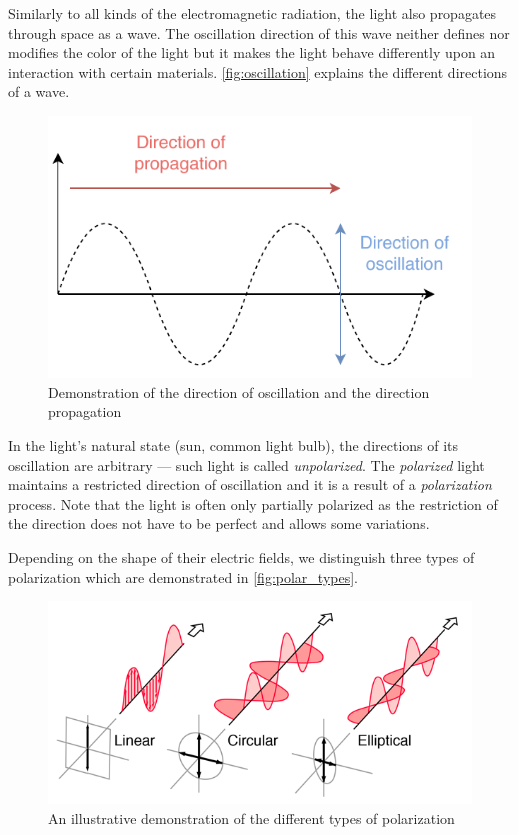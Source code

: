 Similarly to all kinds of the electromagnetic radiation, the light also propagates through space as a wave. The oscillation direction of this wave neither defines nor modifies the color of the light but it makes the light behave differently upon an interaction with certain materials. \autoref{fig:oscillation} explains the different directions of a wave.

\begin{figure}[h]
	\centering
	\includegraphics[width=.6\linewidth]{img/oscillation.pdf}
	\caption{Demonstration of the direction of oscillation and the direction propagation}
	\label{fig:oscillation}
\end{figure}

In the light's natural state (sun, common light bulb), the directions of its oscillation are arbitrary --- such light is called \emph{unpolarized}. The \emph{polarized} light maintains a restricted direction of oscillation and it is a result of a \emph{polarization} process. Note that the light is often only partially polarized as the restriction of the direction does not have to be perfect and allows some variations.

Depending on the shape of their electric fields, we distinguish three types of polarization which are demonstrated in \autoref{fig:polar_types}.

\begin{figure}[h]
	\centering
	\includegraphics[width=.7\linewidth]{img/polar_types.png}
	\caption[polar types]{An illustrative demonstration of the different types of polarization \footnotemark}
	\label{fig:polar_types}
\end{figure}


